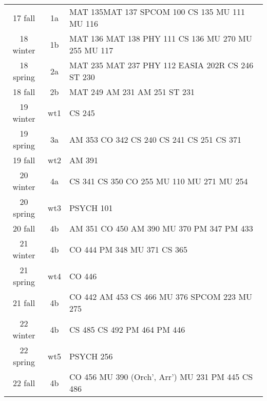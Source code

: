 \documentclass[convert]{standalone}
\begin{document}
\begin{tabular}{|c | c | l |}
	\hline
	17 fall & 1a & MAT 135\quad MAT 137 \quad SPCOM 100 \quad CS 135 \quad MU 111 \quad MU 116 \\
	18 winter & 1b & MAT 136 \quad MAT 138 \quad PHY 111 \quad CS 136 \quad MU 270 \quad MU 255 \quad MU 117 \\
	18 spring & 2a & MAT 235 \quad MAT 237 \quad PHY 112 \quad EASIA 202R \quad CS 246 \quad ST  230 \\
	18 fall & 2b & MAT 249 \quad AM 231 \quad AM 251 \quad ST  231 \\
	19 winter & wt1 & CS 245 \\
	19 spring & 3a & AM 353 \quad CO 342 \quad CS 240 \quad CS 241 \quad CS 251 \quad CS 371 \\
	19 fall & wt2 & AM 391 \\
	20 winter & 4a & CS 341 \quad CS 350 \quad CO 255  \quad MU 110 \quad MU 271 \quad MU 254\\
	20 spring & wt3 & PSYCH 101 \\
	20 fall & 4b & AM 351 \quad CO 450 \quad AM 390  \quad MU 370 \quad PM 347 \quad PM 433\\
	21 winter & 4b & CO 444 \quad PM 348   \quad MU 371   \quad CS 365\\
	21 spring & wt4 &  CO 446 \\
	21 fall & 4b & CO 442  \quad AM 453 \quad CS 466 \quad MU 376 \quad SPCOM 223 \quad MU 275 \\
	22 winter & 4b & CS 485 \quad CS 492 \quad PM 464 \quad PM 446  \\
	22 spring & wt5 & PSYCH 256\\
	22 fall & 4b &  CO 456  \quad MU 390 (Orch', Arr') \quad MU 231 \quad PM 445 \quad CS 486 \\
 \hline

\end{tabular}
\end{document}
